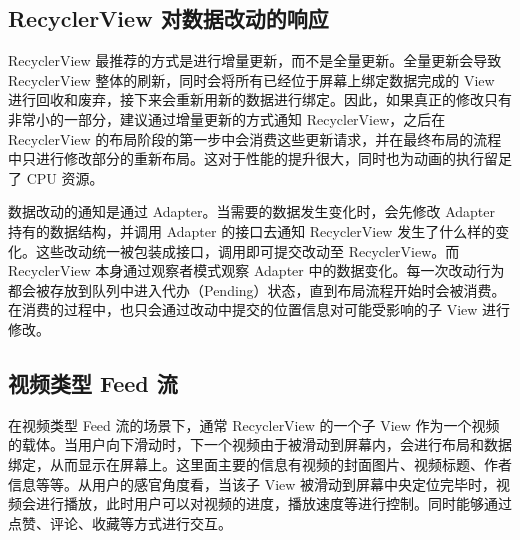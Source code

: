 
\subsection{RecyclerView 对数据改动的响应}

RecyclerView 最推荐的方式是进行增量更新，而不是全量更新。全量更新会导致 RecyclerView 整体的刷新，同时会将所有已经位于屏幕上绑定数据完成的 View 进行回收和废弃，接下来会重新用新的数据进行绑定。因此，如果真正的修改只有非常小的一部分，建议通过增量更新的方式通知 RecyclerView，之后在 RecyclerView 的布局阶段的第一步中会消费这些更新请求，并在最终布局的流程中只进行修改部分的重新布局。这对于性能的提升很大，同时也为动画的执行留足了 CPU 资源。

数据改动的通知是通过 Adapter。当需要的数据发生变化时，会先修改 Adapter 持有的数据结构，并调用 Adapter 的接口去通知 RecyclerView 发生了什么样的变化。这些改动统一被包装成接口，调用即可提交改动至 RecyclerView。而 RecyclerView 本身通过观察者模式观察 Adapter 中的数据变化。每一次改动行为都会被存放到队列中进入代办（Pending）状态，直到布局流程开始时会被消费。在消费的过程中，也只会通过改动中提交的位置信息对可能受影响的子 View 进行修改。

\subsection{视频类型 Feed 流}

在视频类型 Feed 流的场景下，通常 RecyclerView 的一个子 View 作为一个视频的载体。当用户向下滑动时，下一个视频由于被滑动到屏幕内，会进行布局和数据绑定，从而显示在屏幕上。这里面主要的信息有视频的封面图片、视频标题、作者信息等等。从用户的感官角度看，当该子 View 被滑动到屏幕中央定位完毕时，视频会进行播放，此时用户可以对视频的进度，播放速度等进行控制。同时能够通过点赞、评论、收藏等方式进行交互。


